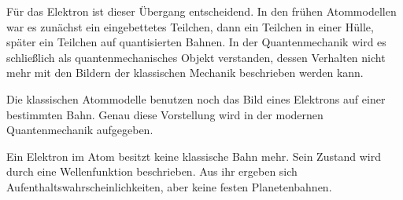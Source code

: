 Für das Elektron ist dieser Übergang entscheidend. In den frühen Atommodellen
war es zunächst ein eingebettetes Teilchen, dann ein Teilchen in einer Hülle,
später ein Teilchen auf quantisierten Bahnen. In der Quantenmechanik wird es
schließlich als quantenmechanisches Objekt verstanden, dessen Verhalten nicht
mehr mit den Bildern der klassischen Mechanik beschrieben werden kann.

\begin{DidacticBox}
	
	\label{box:grenze-klassische-atommodelle}
	Die klassischen Atommodelle benutzen noch das Bild eines Elektrons auf einer
	bestimmten Bahn. Genau diese Vorstellung wird in der modernen Quantenmechanik
	aufgegeben.
	
	Ein Elektron im Atom besitzt keine klassische Bahn mehr. Sein Zustand wird
	durch eine Wellenfunktion beschrieben. Aus ihr ergeben sich
	Aufenthaltswahrscheinlichkeiten, aber keine festen Planetenbahnen.
	
\end{DidacticBox}